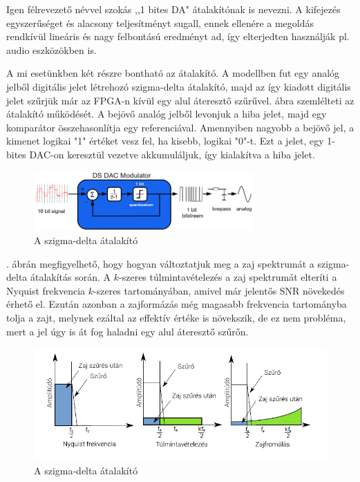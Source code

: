 Igen félrevezető névvel szokás ,,1 bites DA" átalakítónak is nevezni. A kifejezés egyszerűséget és alacsony teljesítményt sugall, ennek ellenére a megoldás rendkívül lineáris és nagy felbontású eredményt ad, így elterjedten használják pl. audio eszközökben is.

A mi esetünkben két részre bontható az átalakító. A modellben fut egy analóg jelből digitális jelet létrehozó szigma-delta átalakító, majd az így kiadott digitális jelet szűrjük már az FPGA-n kívül egy alul áteresztő szűrűvel.  ábra szemlélteti az átalakító működését. A bejövő analóg jelből levonjuk a hiba jelet, majd egy komparátor összehasonlítja egy referenciával. Amennyiben nagyobb a bejövő jel, a kimenet logikai "1" értéket vesz fel, ha kisebb, logikai "0"-t. Ezt a jelet, egy 1-bites DAC-on keresztül vezetve akkumuláljuk, így kialakítva a hiba jelet. 

\begin{figure}[!h]
	\centering
	\includegraphics[width = 0.75\textwidth]{figures/first_oder_sd.png}
	\caption{A szigma-delta átalakító} 
	\label{fig:sigmadelta}
\end{figure}


. ábrán megfigyelhető, hogy hogyan változtatjuk meg a zaj spektrumát a szigma-delta átalakítás során. A $k$-szeres túlmintavételezés a zaj spektrumát elteríti a Nyquist frekvencia $k$-szeres tartományában, amivel már jelentős SNR növekedés érhető el. Ezután azonban a zajformázás még magasabb frekvencia tartományba tolja a zajt, melynek ezáltal az effektív értéke is növekszik, de ez nem probléma, mert a jel úgy is át fog haladni egy alul áteresztő szűrőn.

\begin{figure}[!h]
	\centering
	\includegraphics[width = \textwidth]{figures/noiseshape.png}
	\caption{A szigma-delta átalakító} 
	\label{fig:asd}
\end{figure}

